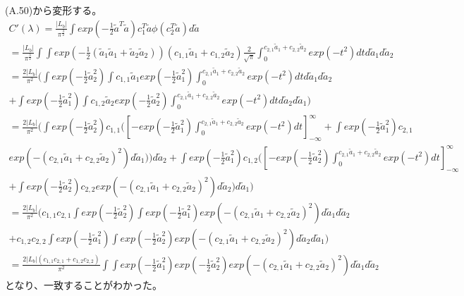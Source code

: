 \documentclass{jsarticle}
\begin{document}
(A.50)から変形する。
\begin{equation}
\begin{split}
C'(\lambda) = \frac{|L_b|}{{\pi}^{\frac{3}{2}}} \int exp(-\frac{1}{2} \tilde{a}^T \tilde{a}) c_1^T \tilde{a} \phi(c_2^T \tilde{a}) d\tilde{a}\\
= \frac{|L_b|}{{\pi}^{\frac{3}{2}}} \int \int exp(-\frac{1}{2} (\tilde{a}_1 \tilde{a}_1 + \tilde{a}_2 \tilde{a}_2)) (c_{1,1}\tilde{a}_1 + c_{1,2}\tilde{a}_2)\frac{2}{\sqrt{\pi}}\int_0^{c_{2,1} \tilde{a}_1 + c_{2,2} \tilde{a}_2} exp(-t^2) dt d\tilde{a}_1 d\tilde{a}_2\\
= \frac{2|L_b|}{{\pi}^{2}} (\int exp(-\frac{1}{2} \tilde{a}_2^2) \int c_{1,1}\tilde{a}_1 exp(-\frac{1}{2} \tilde{a}_1^2) \int_0^{c_{2,1} \tilde{a}_1 + c_{2,2} \tilde{a}_2} exp(-t^2) dt d\tilde{a}_1 d\tilde{a}_2\\
+ \int exp(-\frac{1}{2} \tilde{a}_1^2) \int c_{1,2}\tilde{a}_2 exp(-\frac{1}{2} \tilde{a}_2^2) \int_0^{c_{2,1} \tilde{a}_1 + c_{2,2} \tilde{a}_2} exp(-t^2) dt d\tilde{a}_2 d\tilde{a}_1)\\
= \frac{2|L_b|}{{\pi}^{2}} (\int exp(-\frac{1}{2} \tilde{a}_2^2) c_{1,1} ([- exp(-\frac{1}{2} \tilde{a}_1^2) \int_0^{c_{2,1} \tilde{a}_1 + c_{2,2} \tilde{a}_2} exp(-t^2) dt]_{-\infty}^{\infty} + \int exp(-\frac{1}{2} \tilde{a}_1^2) c_{2,1}\\
exp(-(c_{2,1} \tilde{a}_1 + c_{2,2} \tilde{a}_2)^2) d\tilde{a}_1)) d\tilde{a}_2
+ \int exp(-\frac{1}{2} \tilde{a}_1^2) c_{1,2} ([- exp(-\frac{1}{2} \tilde{a}_2^2) \int_0^{c_{2,1} \tilde{a}_1 + c_{2,2} \tilde{a}_2} exp(-t^2) dt]_{-\infty}^{\infty}\\
+ \int exp(-\frac{1}{2} \tilde{a}_2^2) c_{2,2}exp(-(c_{2,1} \tilde{a}_1 + c_{2,2} \tilde{a}_2)^2) d\tilde{a}_2) d\tilde{a}_1)\\
= \frac{2|L_b|}{{\pi}^{2}} (c_{1, 1}c_{2,1} \int exp(-\frac{1}{2} \tilde{a}_2^2) \int exp(-\frac{1}{2} \tilde{a}_1^2) exp(-(c_{2,1} \tilde{a}_1 + c_{2,2} \tilde{a}_2)^2) d\tilde{a}_1 d\tilde{a}_2\\
+ c_{1,2} c_{2,2} \int exp(-\frac{1}{2} \tilde{a}_1^2) \int exp(-\frac{1}{2} \tilde{a}_2^2) exp(-(c_{2,1} \tilde{a}_1 + c_{2,2} \tilde{a}_2)^2) d\tilde{a}_2 d\tilde{a}_1)\\
= \frac{2|L_b|(c_{1, 1}c_{2,1} + c_{1, 2}c_{2,2})}{{\pi}^{2}} \int \int exp(-\frac{1}{2} \tilde{a}_1^2) exp(-\frac{1}{2} \tilde{a}_2^2) exp(-(c_{2,1} \tilde{a}_1 + c_{2,2} \tilde{a}_2)^2) d\tilde{a}_1 d\tilde{a}_2
\end{split}
\end{equation}
となり、一致することがわかった。
\end{document}
